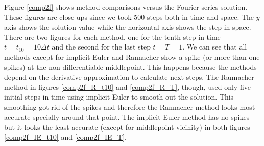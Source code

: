 \documentclass[00main.tex]{subfiles}
\begin{document}
Figure \ref{comp2f} shows method comparisons versus the Fourier series solution. These figures are close-ups since we took 500 steps both in time and space. The $y$ axis shows the solution value while the horizontal axis shows the step in space. There are two figures for each method, one for the tenth step in time $t=t_{10} = 10\Delta t$ and the second for the last step $t=T=1$. We can see that all methods except for implicit Euler and Rannacher show a spike (or more than one spikes) at the non differentiable middlepoint. This happens because the methods depend on the derivative approximation to calculate next steps. The Rannacher method in figures \ref{comp2f_R_t10} and \ref{comp2f_R_T}, though, used only five initial steps in time using implicit Euler to smooth out the solution. This smoothing got rid of the spikes and therefore the Rannacher method looks most accurate specially around that point. The implicit Euler method has no spikes but it looks the least accurate (except for middlepoint vicinity) in both figures \ref{comp2f_IE_t10} and \ref{comp2f_IE_T}.
\end{document}
